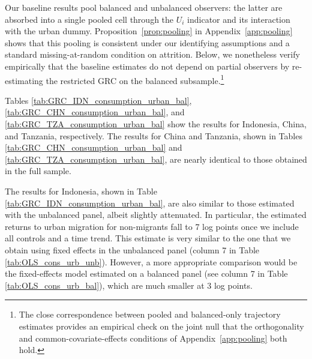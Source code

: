 \documentclass[12pt]{article}
\begin{document}
Our baseline results pool balanced and unbalanced observers: the latter are absorbed into a single pooled cell through the $U_i$ indicator and its interaction with the urban dummy.
Proposition~\ref{prop:pooling} in Appendix~\ref{app:pooling} shows that this pooling is consistent under our identifying assumptions and a standard missing-at-random condition on attrition. 
Below, we nonetheless verify empirically that the baseline estimates do not depend on partial observers by re-estimating the restricted GRC on the balanced subsample.\footnote{The close correspondence between pooled and balanced-only trajectory estimates provides an empirical check on the joint null that the orthogonality and common-covariate-effects conditions of Appendix~\ref{app:pooling} both hold.}

Tables \ref{tab:GRC_IDN_consumption_urban_bal}, \ref{tab:GRC_CHN_consumption_urban_bal}, and \ref{tab:GRC_TZA_consumption_urban_bal}  show the results for Indonesia, China, and Tanzania, respectively.
The results for China and Tanzania, shown in Tables \ref{tab:GRC_CHN_consumption_urban_bal} and \ref{tab:GRC_TZA_consumption_urban_bal}, are nearly identical to those obtained in the full sample.

 
 
 

The results for Indonesia, shown in Table \ref{tab:GRC_IDN_consumption_urban_bal}, are also similar to those estimated with the unbalanced panel, albeit slightly attenuated. 
In particular, the estimated returns to urban migration for non-migrants fall to 7 log points once we include all controls and a time trend. 
This estimate is very similar to the one that we obtain using fixed effects in the unbalanced panel (column 7 in Table \ref{tab:OLS_cons_urb_unb}). 
However, a more appropriate comparison would be the fixed-effects model estimated on a balanced panel (see column 7 in Table \ref{tab:OLS_cons_urb_bal}), which are much smaller at 3 log points. 
\end{document}
